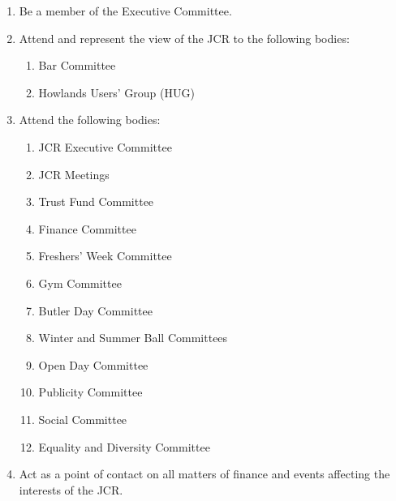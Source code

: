 \begin{enumerate}
    \item Be a member of the Executive Committee.
    \item Attend and represent the view of the JCR to the following bodies:
    \begin{enumerate}
        \item Bar Committee
        \item Howlands Users' Group (HUG)
    \end{enumerate}
    \item Attend the following bodies:
    \begin{enumerate}
        \item JCR Executive Committee
        \item JCR Meetings
        \item Trust Fund Committee
        \item Finance Committee
        \item Freshers’ Week Committee
        \item Gym Committee
        \item Butler Day Committee
        \item Winter and Summer Ball Committees
        \item Open Day Committee
        \item Publicity Committee
        \item Social Committee
        \item Equality and Diversity Committee
    \end{enumerate}
    \item Act as a point of contact on all matters of finance and events affecting the interests of the JCR.


\end{enumerate}
